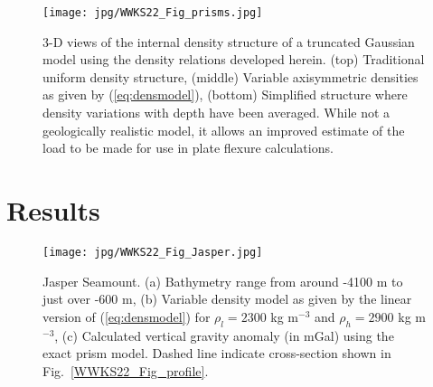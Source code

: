\begin{figure}
\centering
\texttt{[image: jpg/WWKS22\_Fig\_prisms.jpg]}
\caption{3-D views of the internal density structure of a truncated Gaussian model using the density
relations developed herein. (top) Traditional uniform density structure, (middle) Variable axisymmetric densities
as given by (\ref{eq:densmodel}), (bottom) Simplified structure where density variations with depth
have been averaged.  While not a geologically realistic model, it allows an improved estimate of the load
to be made for use in plate flexure calculations.}
\label{WWKS22_Fig_prisms}
\end{figure}

\section{Results}

\begin{figure}
\centering
\texttt{[image: jpg/WWKS22\_Fig\_Jasper.jpg]}
\caption{Jasper Seamount. (a) Bathymetry range from around -4100 m to just over -600 m, (b) Variable density model
as given by the linear version of (\ref{eq:densmodel}) for $\rho_l = 2300$ kg m$^{-3}$ and $\rho_h = 2900$ kg m$^{-3}$,
(c) Calculated vertical gravity anomaly (in mGal) using the exact prism model.  Dashed line indicate cross-section
shown in Fig.~\ref{WWKS22_Fig_profile}.}
\label{WWKS22_Fig_Jasper}
\end{figure}

